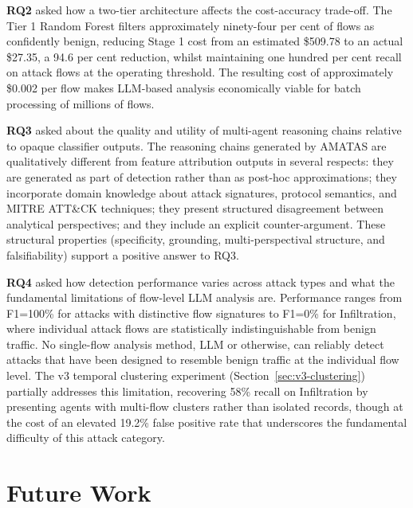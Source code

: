 \textbf{RQ2} asked how a two-tier architecture affects the cost-accuracy trade-off. The Tier 1 Random Forest filters approximately ninety-four per cent of flows as confidently benign, reducing Stage 1 cost from an estimated \$509.78 to an actual \$27.35, a 94.6 per cent reduction, whilst maintaining one hundred per cent recall on attack flows at the operating threshold. The resulting cost of approximately \$0.002 per flow makes LLM-based analysis economically viable for batch processing of millions of flows.

\textbf{RQ3} asked about the quality and utility of multi-agent reasoning chains relative to opaque classifier outputs. The reasoning chains generated by AMATAS are qualitatively different from feature attribution outputs in several respects: they are generated as part of detection rather than as post-hoc approximations; they incorporate domain knowledge about attack signatures, protocol semantics, and MITRE ATT\&CK techniques; they present structured disagreement between analytical perspectives; and they include an explicit counter-argument. These structural properties (specificity, grounding, multi-perspectival structure, and falsifiability) support a positive answer to RQ3.

\textbf{RQ4} asked how detection performance varies across attack types and what the fundamental limitations of flow-level LLM analysis are. Performance ranges from F1=100\% for attacks with distinctive flow signatures to F1=0\% for Infiltration, where individual attack flows are statistically indistinguishable from benign traffic. No single-flow analysis method, LLM or otherwise, can reliably detect attacks that have been designed to resemble benign traffic at the individual flow level. The v3 temporal clustering experiment (Section~\ref{sec:v3-clustering}) partially addresses this limitation, recovering 58\% recall on Infiltration by presenting agents with multi-flow clusters rather than isolated records, though at the cost of an elevated 19.2\% false positive rate that underscores the fundamental difficulty of this attack category.

\section{Future Work}
\label{sec:future}

